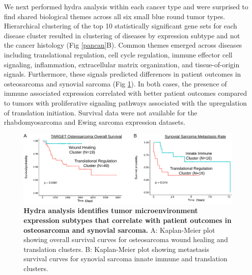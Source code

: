 \documentclass[10pt,letterpaper]{article}
\begin{document}
We next performed hydra analysis within each cancer type and were surprised to find shared biological themes across all six small blue round tumor types. Hierarchical clustering of the top 10 statistically significant gene sets for each disease cluster resulted in clustering of diseases by expression subtype and not the cancer histology (Fig \ref{pancan}B). Common themes emerged across diseases including translational regulation, cell cycle regulation, immune effector cell signaling, inflammation, extracellular matrix organization, and tissue-of-origin signals. Furthermore, these signals predicted differences in patient outcomes in osteosarcoma and synovial sarcoma (Fig \ref{surv}). In both cases, the presence of immune associated expression correlated with better patient outcomes compared to tumors with proliferative signaling pathways associated with the upregulation of translation initiation. Survival data were not available for the rhabdomyosarcoma and Ewing sarcoma expression datasets.

%
%

\begin{figure}[!h]
	\includegraphics[width=\textwidth]{img/PNG/synovial-osteo-sarcoma-survival-figure}
	\caption{{\bf Hydra analysis identifies tumor microenvironment expression subtypes that correlate with patient outcomes in osteosarcoma and synovial sarcoma.} A: Kaplan-Meier plot showing overall survival curves for osteosarcoma wound healing and translation clusters. B: Kaplan-Meier plot showing metastasis survival curves for synovial sarcoma innate immune and translation clusters.}
	\label{surv}
\end{figure}
\end{document}
